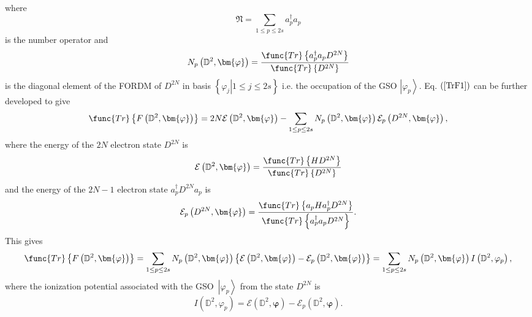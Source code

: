 \documentclass{preprint}
\begin{document}
where
\begin{equation}
\mathfrak{N=}\sum_{1\leq p\leq2s}a_{p}^{\dagger}a_{p}
\end{equation}
is the number operator and
\begin{equation}
N_{p}\left( \mathbb{D}^{2},\bm{\varphi}\right) =\frac{\func{Tr}\left\{
a_{p}^{\dagger}a_{p}D^{2N}\right\} }{\func{Tr}\left\{ D^{2N}\right\} }
\end{equation}
is the diagonal element of the FORDM of $D^{2N}$ in basis $\left\{ \left.
\varphi_{j}\right\vert 1\leq j\leq2s\right\} $ i.e. the occupation of the
GSO $\left\vert \varphi_{p}\right\rangle .$ Eq. $\left( \ref{TrF1}\right) $
can be further developed to give
\begin{equation}
\func{Tr}\left\{ F\left( \mathbb{D}^{2},\bm{\varphi}\right) \right\} =2N%
\mathcal{E}\left( \mathbb{D}^{2},\bm{\varphi}\right) -\sum_{1\leq
p\leq2s}N_{p}\left( \mathbb{D}^{2},\bm{\varphi}\right) \mathcal{E}_{p}\left(
D^{2N},\bm{\varphi}\right) ,
\end{equation}
where the energy of the $2N$ electron state $D^{2N}$ is
\begin{equation}
\mathcal{E}\left( \mathbb{D}^{2},\bm{\varphi}\right) =\frac {\func{Tr}%
\left\{ HD^{2N}\right\} }{\func{Tr}\left\{ D^{2N}\right\} }
\end{equation}
and the energy of the $2N-1$ electron state $a_{p}^{\dagger}D^{2N}a_{p}$ is
\begin{equation}
\mathcal{E}_{p}\left( D^{2N},\bm{\varphi}\right) =\frac{\func{Tr}\left\{
a_{p}Ha_{p}^{\dagger}D^{2N}\right\} }{\func{Tr}\left\{
a_{p}^{\dagger}a_{p}D^{2N}\right\} }.
\end{equation}
This gives
\begin{equation}
\func{Tr}\left\{ F\left( \mathbb{D}^{2},\bm{\varphi}\right) \right\}
=\sum_{1\leq p\leq2s}N_{p}\left( \mathbb{D}^{2},\bm{\varphi }\right) \left\{
\mathcal{E}\left( \mathbb{D}^{2},\bm{\varphi}\right) -\mathcal{E}_{p}\left(
\mathbb{D}^{2},\bm{\varphi}\right) \right\} =\sum_{1\leq p\leq2s}N_{p}\left(
\mathbb{D}^{2},\bm{\varphi}\right) I\left( \mathbb{D}^{2},\varphi
_{p}\right) ,  \label{TrF}
\end{equation}
where the ionization potential associated with the GSO\ $\left\vert
\varphi_{p}\right\rangle $ from the state $D^{2N}$ is
\begin{equation}
I\left( \mathbb{D}^{2},\varphi_{p}\right) =\mathcal{E}\left( \mathbb{D}^{2},%
\bm{\varphi}\right) -\mathcal{E}_{p}\left( \mathbb{D}^{2},\bm{\varphi}%
\right) .
\end{equation}
\end{document}
